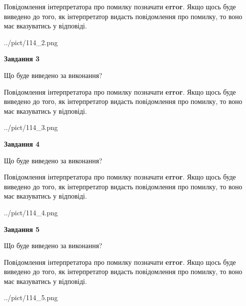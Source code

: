 \documentclass[12pt, ukrainian]{article}
\begin{document}
{\begin {large}
Повідомлення інтерпретатора про помилку позначати \textbf{error}.
Якщо щось буде виведено до того, як інтерпретатор видасть повідомлення про помилку, 
то воно має вказуватись у відповіді. \par


\begin{center}
	{../pict/114_2.png}
\end{center}
\newpage

{\begin {center}\textbf{Завдання 3}\end {center}}\par
Що буде виведено за виконання?

Повідомлення інтерпретатора про помилку позначати \textbf{error}.
Якщо щось буде виведено до того, як інтерпретатор видасть повідомлення про помилку, 
то воно має вказуватись у відповіді. \par


\begin{center}
	{../pict/114_3.png}
\end{center}
\newpage

{\begin {center}\textbf{Завдання 4}\end {center}}\par
Що буде виведено за виконання?

Повідомлення інтерпретатора про помилку позначати \textbf{error}.
Якщо щось буде виведено до того, як інтерпретатор видасть повідомлення про помилку, 
то воно має вказуватись у відповіді. \par


\begin{center}
	{../pict/114_4.png}
\end{center}
\newpage

{\begin {center}\textbf{Завдання 5}\end {center}}\par
Що буде виведено за виконання?

Повідомлення інтерпретатора про помилку позначати \textbf{error}.
Якщо щось буде виведено до того, як інтерпретатор видасть повідомлення про помилку, 
то воно має вказуватись у відповіді. \par


\begin{center}
	{../pict/114_5.png}
\end{center}
\newpage


\end{large}}
\end{document}
